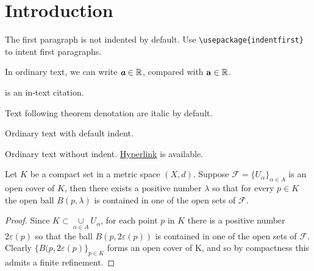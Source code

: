 \section{Introduction}

The first paragraph is not indented by default. Use \texttt{\textbackslash usepackage\{indentfirst\}} to intent first paragraphs.

In ordinary text, we can write $\textbf{\em a} \in \mathbb{R}$, compared with $\mathbf{a} \in \mathbb{R}$.

\mydef \cite{einstein} is an in-text citation. 

Text following theorem denotation are italic by default.

\rm %

Ordinary text with default indent.

\noindent Ordinary text without indent. \href{https://www.overleaf.com/learn/latex/Hyperlinks}{Hyperlink} is available.

\thm Let $K$ be a compact set in a metric space $(X,d)$. Suppose $\mathcal{F}=\{U_\alpha\}_{\alpha \in A}$ is an open cover of $K$, then there exists a positive number $\lambda$ so that for every $p \in K$ the open ball $B(p,\lambda)$ is contained in one of the open sets of $\mathcal{F}$.

\begin{proof}

Since $K \subset \underset{\alpha \in A}\cup U_\alpha$, for each point $p$ in $K$ there is a positive number $2\varepsilon(p)$ so that the ball $B(p,2\varepsilon(p))$ is contained in one of the open sets of $\mathcal{F}$. Clearly $\{B(p,2\varepsilon(p)\}_{p \in K}$ forms an open cover of K, and so by compactness this admits a finite refinement.

\end{proof}
